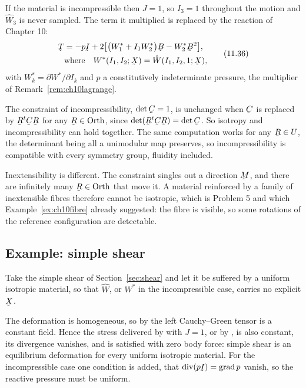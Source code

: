 If the material is incompressible then $J=1$, so $I_{3}=1$ throughout
the motion and $\hat W_{3}$ is never sampled. The term it multiplied is
replaced by the reaction of Chapter 10:
\begin{equation}
\begin{aligned}
   \bT&=-p\I+2\big[\big(W^{*}_{1}+I_{1}W^{*}_{2}\big)\bB
   -W^{*}_{2}\bB^{2}\big],\\
   &\text{where}\quad W^{*}(I_{1},I_{2};\bX)=\hat W(I_{1},I_{2},1;\bX),
\end{aligned}
   \tag{11.36}\label{eq:11.36}
\end{equation}
with $W^{*}_{k}=\partial W^{*}/\partial I_{k}$ and $p$ a constitutively
indeterminate pressure, the multiplier of
Remark~\ref{rem:ch10lagrange}.

\begin{remark}%
\label{rem:ch11constraint}
The constraint  of incompressibility, $\det\bC=1$, is
unchanged when $\bC$ is replaced by $\bR^{t}\bC\bR$ for any
$\bR\in\Orth$, since $\det(\bR^{t}\bC\bR)=\det\bC$. So isotropy and
incompressibility can hold together. The same computation works for any
$\bR\in U$, the determinant being all a unimodular map preserves, so
incompressibility is compatible with every symmetry group, fluidity
included.

Inextensibility is different. The constraint  singles out a
direction $\bM$, and there are infinitely many $\bR\in\Orth$ that move
it. A material reinforced by a family of inextensible fibres therefore
cannot be isotropic, which is Problem 5 and which
Example~\ref{ex:ch10fibre} already suggested: the fibre is visible, so
some rotations of the reference configuration are detectable.
\end{remark}

\subsection*{Example: simple shear}

Take the simple shear of Section~\ref{sec:shear} and let it be
suffered by a uniform isotropic material, so that $\hat W$, or $W^{*}$
in the incompressible case, carries no explicit $\bX$.

The deformation is homogeneous, so by  the left Cauchy--Green
tensor is a constant field. Hence the stress delivered by 
with $J=1$, or by , is also constant, its divergence
vanishes, and  is satisfied with zero body force: simple
shear is an equilibrium deformation for every uniform isotropic
material. For the incompressible case one condition is added, that
$\dvg(p\I)=\grad p$ vanish, so the reactive pressure must be uniform.


